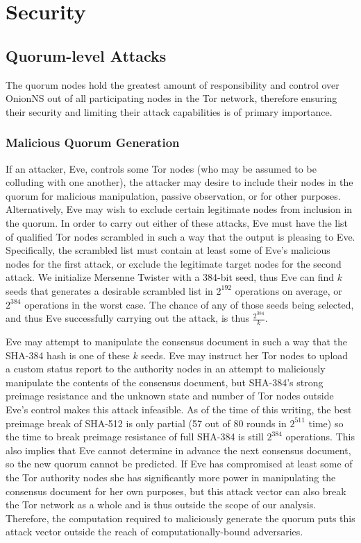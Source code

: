 \section{Security}

\subsection{Quorum-level Attacks}

The quorum nodes hold the greatest amount of responsibility and control over OnionNS out of all participating nodes in the Tor network, therefore ensuring their security and limiting their attack capabilities is of primary importance.

\subsubsection{Malicious Quorum Generation}

If an attacker, Eve, controls some Tor nodes (who may be assumed to be colluding with one another), the attacker may desire to include their nodes in the quorum for malicious manipulation, passive observation, or for other purposes. Alternatively, Eve may wish to exclude certain legitimate nodes from inclusion in the quorum. In order to carry out either of these attacks, Eve must have the list of qualified Tor nodes scrambled in such a way that the output is pleasing to Eve. Specifically, the scrambled list must contain at least some of Eve's malicious nodes for the first attack, or exclude the legitimate target nodes for the second attack. We initialize Mersenne Twister with a 384-bit seed, thus Eve can find $ k $ seeds that generates a desirable scrambled list in $ 2^{192} $ operations on average, or $ 2^{384} $ operations in the worst case. The chance of any of those seeds being selected, and thus Eve successfully carrying out the attack, is thus $ \frac{2^{384}}{k} $.

Eve may attempt to manipulate the consensus document in such a way that the SHA-384 hash is one of these $ k $ seeds. Eve may instruct her Tor nodes to upload a custom status report to the authority nodes in an attempt to maliciously manipulate the contents of the consensus document, but SHA-384's strong preimage resistance and the unknown state and number of Tor nodes outside Eve's control makes this attack infeasible. As of the time of this writing, the best preimage break of SHA-512 is only partial (57 out of 80 rounds in $ 2^{511} $ time\cite{li2012converting}) so the time to break preimage resistance of full SHA-384 is still $ 2^{384} $ operations. This also implies that Eve cannot determine in advance the next consensus document, so the new quorum cannot be predicted. If Eve has compromised at least some of the Tor authority nodes she has significantly more power in manipulating the consensus document for her own purposes, but this attack vector can also break the Tor network as a whole and is thus outside the scope of our analysis. Therefore, the computation required to maliciously generate the quorum puts this attack vector outside the reach of computationally-bound adversaries.

